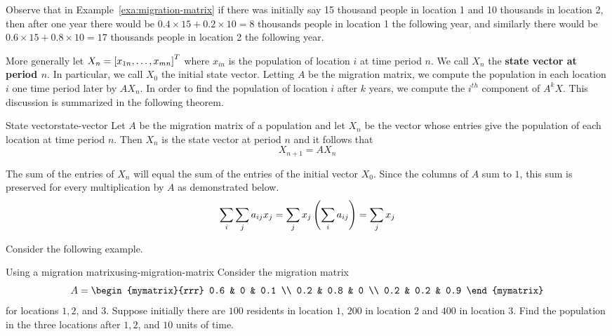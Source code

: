 Observe that in Example~\ref{exa:migration-matrix} if there was initially say 15
thousand people in location 1 and 10 thousands in location 2, then
after one year there would be $0.4 \times 15 + 0.2 \times 10 = 8$
thousands people in location 1 the following year, and similarly 
there would be $0.6 \times 15 + 0.8 \times 10 = 17$
thousands people in location 2 the following year.

More generally let $X_n=\left[x_{1n}, \ldots, x_{mn}\right] ^{T}$ where $x_{in}$ is the
population of location $i$ at time period $n$. We call $X_n$ the \textbf{state vector at period $n$}. In particular, we call $X_0$ the initial state vector. Letting $A$ be the migration matrix, we compute the population in each location $i$ one time period later by $AX_n$. In order to find the population of location $i$ after $k$
years, we compute the $i^{th}$ component of $A^{k}X$. This discussion is summarized in the following theorem. 

\begin{theorem}{State vector}{state-vector}
Let $A$ be the migration matrix of a population and let $X_n$ be the vector whose entries give the population of each location at time period $n$. Then $X_n$ is the state vector at period $n$ and it follows that 
\[
X_{n+1} = A X_n
\]
\end{theorem}

The sum of the entries of $X_n$ will equal the sum of the entries of the initial
vector $X_{0}$. Since the columns of $A$ sum to $1$, this sum is preserved for every
multiplication by $A$ as demonstrated below. 
\begin{equation*}
\sum_{i}\sum_{j}a_{ij}x_{j}=\sum_{j}x_{j}\left(\sum_{i}a_{ij}\right)
=\sum_{j}x_{j}
\end{equation*}

Consider the following example.

\begin{example}{Using a migration matrix}{using-migration-matrix}
Consider the migration matrix 
\begin{equation*}
A = 
\begin{mymatrix}{rrr}
0.6 & 0 & 0.1 \\
0.2 & 0.8 & 0 \\
0.2 & 0.2 & 0.9
\end{mymatrix} 
\end{equation*}
 for locations $1,2$, and $3$. Suppose initially there are $100$
residents in location $1$, $200$ in location $2$ and $400$ in location $3$. Find the
population in the three locations after $1,2$, and $10$ units of time.
\end{example}

